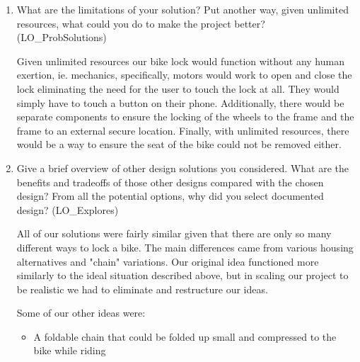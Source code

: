 \documentclass[12pt, titlepage]{article}
\begin{document}
\begin{enumerate}
  \item What are the limitations of your solution?  Put another way, given
  unlimited resources, what could you do to make the project better? (LO\_ProbSolutions)
  
  Given unlimited resources our bike lock would function without any human exertion, ie. mechanics, specifically, motors would work to open and close the lock eliminating the need for the user to touch the lock at all. They would simply have to touch a button on their phone. Additionally, there would be separate components to ensure the locking of the wheels to the frame and the frame to an external secure location.  Finally, with unlimited resources, there would be a way to ensure the seat of the bike could not be removed either.
  
  \item Give a brief overview of other design solutions you considered.  What
  are the benefits and tradeoffs of those other designs compared with the chosen
  design?  From all the potential options, why did you select documented design?
  (LO\_Explores)
  
  All of our solutions were fairly similar given that there are only so many different ways to lock a bike. The main differences came from various housing alternatives and "chain" variations. Our original idea functioned more similarly to the ideal situation described above, but in scaling our project to be realistic we had to eliminate and restructure our ideas.  
  
  Some of our other ideas were: 
  \begin{itemize}
\item A foldable chain that could be folded up small and compressed to the bike while riding

\end{itemize}
  
\end{enumerate}
\end{document}
